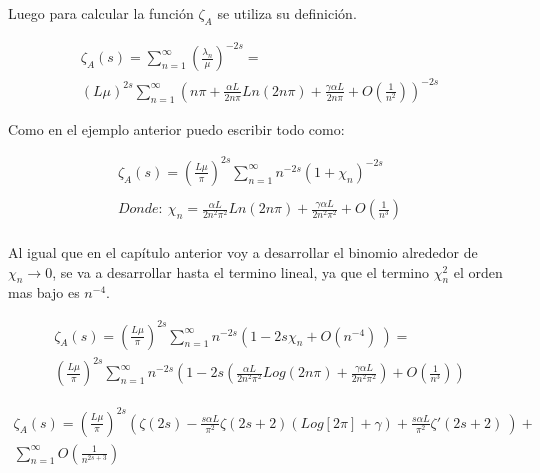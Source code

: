 Luego para calcular la función $\zeta _{A}$ se utiliza su definición.

\begin{equation}
\begin{array}{c}
    \zeta _A (s) = \sum _{n=1} ^{\infty} \left( \frac{\lambda _n}{\mu} \right) ^{-2 s}  = \\
    ( L \mu ) ^{2 s} \sum _{n=1} ^{\infty} 
    \left( 
    n \pi + \frac{\alpha L }{2 n \pi} Ln(2 n \pi) + \frac{\gamma \alpha L}{2 n \pi} +
    O(\frac{1}{n^2})
    \right) ^{-2s}
    
\end{array}
\end{equation}

Como en el ejemplo anterior puedo escribir todo como:

\begin{equation}
\begin{array}{c}
    \zeta _A (s) = \left( \frac{L \mu }{\pi} \right)  ^{2 s} 
    \sum _{n=1} ^{\infty} n ^{- 2  s} 
    \left(
    	1 + \chi _n 
    	\right) ^{-2 s} \\ \\
    	Donde: \ \chi _n = 
    	\frac{\alpha L  }{2 n^2 \pi ^2} Ln(2 n \pi) + 
    	\frac{\gamma \alpha L}{2 n^2 \pi ^2 } +
    	O \left(
    		\frac{1}{n^3} \right)    	\\	
    		 
\end{array}
\end{equation}

Al igual que en el capítulo anterior voy a desarrollar el binomio alrededor de  $\chi _n \rightarrow 0$, se va a desarrollar hasta el termino lineal, ya que el termino $\chi _n ^2 $ el orden mas bajo es $n ^{-4} $. 


\begin{equation}
\begin{array}{c}
    \zeta _A (s) = ( \frac{L \mu}{\pi} ) ^{2 s}
    \sum _{n=1} ^{\infty} 
    n ^{-2s}
    \left(
    1 - 2 s \chi _n + O(n ^{-4}) \
    \right) =  \\
    ( \frac{L \mu }{\pi} ) ^{2 s}
    \sum _{n=1} ^{\infty} n ^{-2 s} 
    \left(
    1 - 2s \left(
    \frac{\alpha L }{2 n ^2 \pi ^2} Log( 2  n \pi) + 
    \frac{\gamma \alpha L }{2 n ^2 \pi ^2} 
	\right) +
    O (\frac{1}{n ^{3} }  )
    \right)
\end{array}
\end{equation}


\begin{equation}
\begin{array}{c}
    \zeta _A (s) = 
    \left( \frac{L \mu }{ \pi } \right) ^{2 s}  
    \left(
    \zeta (2 s) -
	\frac{ s \alpha L}{ \pi ^2} \zeta (2s+2)
	\left(
	   Log[2  \pi ] + \gamma
	\right) +
    \frac{s \alpha L}{\pi ^2}
	\zeta '(2s+2) \
	\right) + \\
    \sum _{n=1} ^{\infty} O \left( \frac{1}{n ^{2s+3}} \right)
\end{array}
\end{equation}

